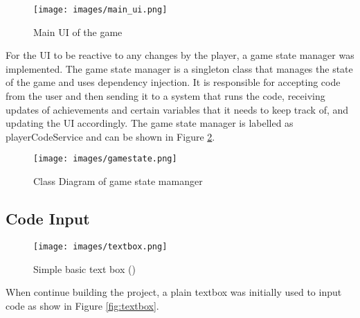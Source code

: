 \begin{figure}[H]
    \centering
    \texttt{[image: images/main\_ui.png]}
    \caption{Main UI of the game}    
    \label{fig:main_ui}
\end{figure}
For the UI to be reactive to any changes by the player, a game state manager was implemented. The game state manager is a singleton class that manages the state of the game and uses dependency injection. It is responsible for accepting code from the user and then sending it to a system that runs the code, receiving updates of achievements and certain variables that it needs to keep track of, and updating the UI accordingly. The game state manager is labelled as playerCodeService and can be shown in Figure \ref{fig:game_state}.
\begin{figure}[H]
    \centering
    \texttt{[image: images/gamestate.png]}
    \caption{Class Diagram of game state mamanger}    
    \label{fig:game_state}
\end{figure}

\subsection{Code Input}
\begin{wrapfigure}{r}{0.5\textwidth}
    \centering
    \texttt{[image: images/textbox.png]}
    \caption{Simple basic text box (\cite{azatbekuly2023enhancing})}
\end{wrapfigure}
When continue building the project, a plain textbox was initially used to input code as show in Figure \ref{fig:textbox}. 

